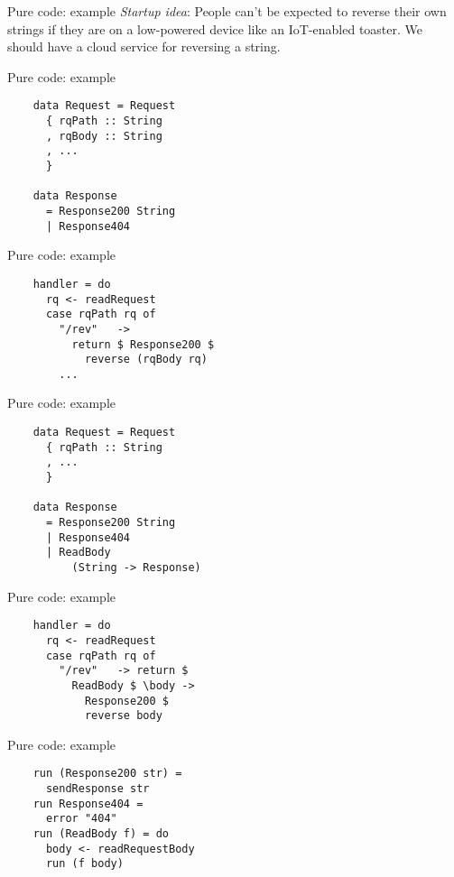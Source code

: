 \documentclass[20pt]{beamer}
\begin{document}
\begin{frame}{Pure code: example}
    \emph{Startup idea}: People can't be expected to reverse their own strings
    if they are on a low-powered device like an IoT-enabled toaster. We should
    have a cloud service for reversing a string.
\end{frame}

\begin{frame}[fragile]{Pure code: example}
    \begin{lstlisting}
    data Request = Request
      { rqPath :: String
      , rqBody :: String
      , ...
      }

    data Response
      = Response200 String
      | Response404
    \end{lstlisting}
\end{frame}

\begin{frame}[fragile]{Pure code: example}
    \begin{lstlisting}
    handler = do
      rq <- readRequest
      case rqPath rq of
        "/rev"   ->
          return $ Response200 $
            reverse (rqBody rq)
        ...
    \end{lstlisting}
\end{frame}

\begin{frame}[fragile]{Pure code: example}
    \begin{lstlisting}
    data Request = Request
      { rqPath :: String
      , ...
      }

    data Response
      = Response200 String
      | Response404
      | ReadBody
          (String -> Response)
    \end{lstlisting}
\end{frame}

\begin{frame}[fragile]{Pure code: example}
    \begin{lstlisting}
    handler = do
      rq <- readRequest
      case rqPath rq of
        "/rev"   -> return $
          ReadBody $ \body ->
            Response200 $
            reverse body
    \end{lstlisting}
\end{frame}

\begin{frame}[fragile]{Pure code: example}
    \begin{lstlisting}
    run (Response200 str) =
      sendResponse str
    run Response404 =
      error "404"
    run (ReadBody f) = do
      body <- readRequestBody
      run (f body)
    \end{lstlisting}
\end{frame}
\end{document}
